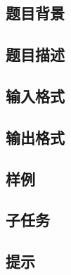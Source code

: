 \subsection*{题目背景}

\subsection*{题目描述}

\subsection*{输入格式}

\subsection*{输出格式}

\subsection*{样例}

\subsection*{子任务}

\subsection*{提示}


